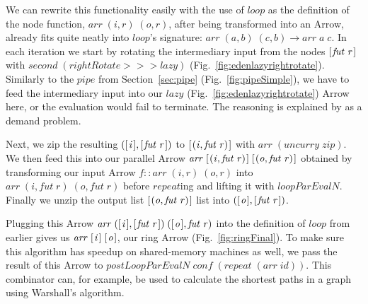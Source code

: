 \documentclass{jfp1}
\newcommand{\Varid}[1]{\mathit{#1}}
\renewcommand{\cite}[1]{\citep{#1}}
\begin{document}
We can rewrite this functionality easily with the use of \ensuremath{\Varid{loop}} as the definition of the node function, \ensuremath{\Varid{arr}\;(\Varid{i},\Varid{r})\;(\Varid{o},\Varid{r})}, after being transformed into an Arrow, already fits quite neatly into \ensuremath{\Varid{loop}}'s signature: \ensuremath{\Varid{arr}\;(\Varid{a},\Varid{b})\;(\Varid{c},\Varid{b})\to \Varid{arr}\;\Varid{a}\;\Varid{c}}. In each iteration we start by rotating the intermediary input from the nodes \ensuremath{[\mskip1.5mu \Varid{fut}\;\Varid{r}\mskip1.5mu]} with \ensuremath{\Varid{second}\;(\Varid{rightRotate}\mathbin{>\!\!>\!\!>}\Varid{lazy})} (Fig.~\ref{fig:edenlazyrightrotate}). Similarly to the \ensuremath{\Varid{pipe}} from Section~\ref{sec:pipe} (Fig.~\ref{fig:pipeSimple}), we have to feed the intermediary input into our \ensuremath{\Varid{lazy}} (Fig.~\ref{fig:edenlazyrightrotate}) Arrow here, or the evaluation would fail to terminate. The reasoning is explained by \citet{Loogen2012} as a demand problem.

Next, we zip the resulting \ensuremath{([\mskip1.5mu \Varid{i}\mskip1.5mu],[\mskip1.5mu \Varid{fut}\;\Varid{r}\mskip1.5mu])} to \ensuremath{[\mskip1.5mu (\Varid{i},\Varid{fut}\;\Varid{r})\mskip1.5mu]} with \ensuremath{\Varid{arr}\;(\Varid{uncurry}\;\Varid{zip})}. We then feed this into our parallel Arrow \ensuremath{\Varid{arr}\;[\mskip1.5mu (\Varid{i},\Varid{fut}\;\Varid{r})\mskip1.5mu]\;[\mskip1.5mu (\Varid{o},\Varid{fut}\;\Varid{r})\mskip1.5mu]} obtained by transforming our input Arrow \ensuremath{\Varid{f}\mathbin{::}\Varid{arr}\;(\Varid{i},\Varid{r})\;(\Varid{o},\Varid{r})} into \ensuremath{\Varid{arr}\;(\Varid{i},\Varid{fut}\;\Varid{r})\;(\Varid{o},\Varid{fut}\;\Varid{r})} before \ensuremath{\Varid{repeat}}ing and lifting it with \ensuremath{\Varid{loopParEvalN}}. Finally we unzip the output list \ensuremath{[\mskip1.5mu (\Varid{o},\Varid{fut}\;\Varid{r})\mskip1.5mu]} list into \ensuremath{([\mskip1.5mu \Varid{o}\mskip1.5mu],[\mskip1.5mu \Varid{fut}\;\Varid{r}\mskip1.5mu])}.

Plugging this Arrow \ensuremath{\Varid{arr}\;([\mskip1.5mu \Varid{i}\mskip1.5mu],[\mskip1.5mu \Varid{fut}\;\Varid{r}\mskip1.5mu])\;([\mskip1.5mu \Varid{o}\mskip1.5mu],\Varid{fut}\;\Varid{r})} into the definition of \ensuremath{\Varid{loop}} from earlier gives us \ensuremath{\Varid{arr}\;[\mskip1.5mu \Varid{i}\mskip1.5mu]\;[\mskip1.5mu \Varid{o}\mskip1.5mu]}, our ring Arrow (Fig.~\ref{fig:ringFinal}). To make sure this algorithm has speedup on shared-memory machines as well, we pass the result of this Arrow to \ensuremath{\Varid{postLoopParEvalN}\;\Varid{conf}\;(\Varid{repeat}\;(\Varid{arr}\;\Varid{id}))}.
This combinator can, for example, be used to calculate the shortest paths in a graph using Warshall's algorithm.
\end{document}
